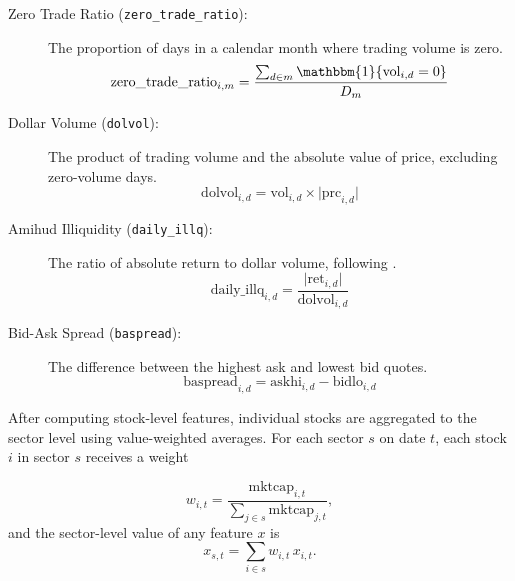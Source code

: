 \begin{description}
  \item[Zero Trade Ratio (\texttt{zero\_trade\_ratio}):]  
    The proportion of days in a calendar month where trading volume is zero.
    \begin{equation}
    \label{eq:zero_trade_ratio}
    \text{zero\_trade\_ratio}_{i,m}
    = \frac{\sum_{d\in m}\mathbbm{1}\{\text{vol}_{i,d}=0\}}{D_m}
    \end{equation}

  \item[Dollar Volume (\texttt{dolvol}):]  
    The product of trading volume and the absolute value of price, excluding zero-volume days.
    \begin{equation}
    \label{eq:dolvol}
    \text{dolvol}_{i,d} = \text{vol}_{i,d}\times \bigl|\text{prc}_{i,d}\bigr|
    \end{equation}

  \item[Amihud Illiquidity (\texttt{daily\_illq}):]  
    The ratio of absolute return to dollar volume, following \cite{Amihud2002}.
    \begin{equation}
    \label{eq:daily_illq}
    \text{daily\_illq}_{i,d}
    = \frac{\bigl|\text{ret}_{i,d}\bigr|}{\text{dolvol}_{i,d}}
    \end{equation}

  \item[Bid-Ask Spread (\texttt{baspread}):]  
    The difference between the highest ask and lowest bid quotes.
    \begin{equation}
    \label{eq:baspread}
    \text{baspread}_{i,d} = \text{askhi}_{i,d} - \text{bidlo}_{i,d}
    \end{equation}

    
\end{description}

After computing stock-level features, individual stocks are aggregated to the sector level using value-weighted averages. For each sector \(s\) on date \(t\), each stock \(i\) in sector \(s\) receives a weight 

\begin{equation}
\label{eq:sect_aggr}
w_{i,t} = \frac{\mathrm{mktcap}_{i,t}}{\sum_{j\in s}\mathrm{mktcap}_{j,t}},
\end{equation}
and the sector-level value of any feature \(x\) is  
\begin{equation}
\label{eq:sector_level}
x_{s,t} = \sum_{i\in s} w_{i,t}\,x_{i,t}.
\end{equation}


